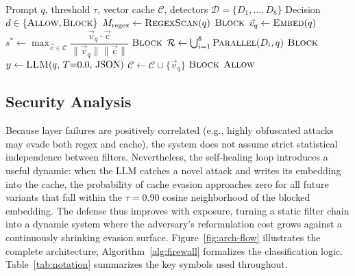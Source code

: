 \documentclass[conference]{IEEEtran}
\begin{document}
\begin{algorithm}[t]
\caption{Semantic Firewall Classification Pipeline}
\label{alg:firewall}
\begin{algorithmic}[1]
\Require Prompt $q$, threshold $\tau$, vector cache $\mathcal{C}$, detectors $\mathcal{D} = \{D_1, \ldots, D_8\}$
\Ensure Decision $d \in \{\textsc{Allow}, \textsc{Block}\}$
\State $M_{\text{regex}} \leftarrow \textsc{RegexScan}(q)$ 
    \State \Return $\textsc{Block}$
\EndIf
\State $\vec{v}_q \leftarrow \textsc{Embed}(q)$ 
\State $s^* \leftarrow \max_{\vec{c} \in \mathcal{C}} \dfrac{\vec{v}_q \cdot \vec{c}}{\|\vec{v}_q\| \|\vec{c}\|}$
    \State \Return $\textsc{Block}$
\EndIf
\State $\mathcal{R} \leftarrow \bigcup_{i=1}^{8} \textsc{Parallel}(D_i, q)$ 
    \State \Return $\textsc{Block}$
\EndIf
\State $y \leftarrow \textsc{LLM}(q,\, T{=}0.0,\, \text{JSON})$ 
    \State $\mathcal{C} \leftarrow \mathcal{C} \cup \{\vec{v}_q\}$ 
    \State \Return $\textsc{Block}$
\EndIf
\State \Return $\textsc{Allow}$
\end{algorithmic}
\end{algorithm}

\subsection{Security Analysis}

Because layer failures are positively correlated (e.g., highly
obfuscated attacks may evade both regex and cache), the system
does not assume strict statistical independence between filters.
Nevertheless, the self-healing loop introduces a useful dynamic: when the LLM catches a novel
attack and writes its embedding into the cache, the probability of
cache evasion approaches zero for all future variants that
fall within the $\tau{=}0.90$ cosine neighborhood of the blocked
embedding. The defense thus improves with exposure, turning a static
filter chain into a dynamic system where the adversary's
reformulation cost grows against a continuously shrinking evasion
surface.
Figure~\ref{fig:arch-flow} illustrates the complete
architecture; Algorithm~\ref{alg:firewall} formalizes the
classification logic. Table~\ref{tab:notation} summarizes the key
symbols used throughout.



\end{document}
